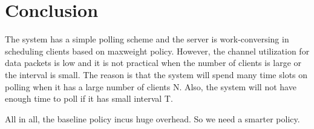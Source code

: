 \documentclass{article}
\begin{document}
\section{Conclusion}
The system has a simple polling scheme and the server is work-conversing in scheduling clients based on maxweight policy. However, the channel utilization for data packets is low and it is not practical when the number of clients is large or the interval is small. The reason is that the system will spend many time slots on polling when it has a large number of clients N. Also, the system will not have enough time to poll if it has small interval T. 

All in all, the baseline policy incus huge overhead. So we need a smarter policy.
\end{document}
